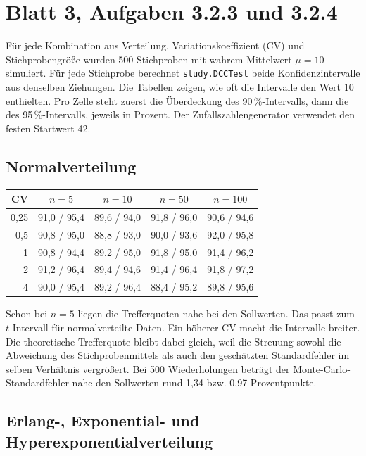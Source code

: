 \documentclass[a4paper,11pt]{article}
\begin{document}
\section*{Blatt 3, Aufgaben 3.2.3 und 3.2.4}

Für jede Kombination aus Verteilung, Variationskoeffizient (CV) und
Stichprobengröße wurden 500 Stichproben mit wahrem Mittelwert \(\mu=10\)
simuliert. Für jede Stichprobe berechnet \texttt{study.DCCTest} beide
Konfidenzintervalle aus denselben Ziehungen. Die Tabellen zeigen, wie oft
die Intervalle den Wert 10 enthielten. Pro Zelle steht zuerst die
Überdeckung des 90\,\%-Intervalls, dann die des 95\,\%-Intervalls, jeweils
in Prozent. Der Zufallszahlengenerator verwendet den festen Startwert 42.

\subsection*{Normalverteilung}

\begin{center}
\begin{tabular}{@{}rcccc@{}}
\toprule
CV & \(n=5\) & \(n=10\) & \(n=50\) & \(n=100\) \\
\midrule
0,25 & 91,0 / 95,4 & 89,6 / 94,0 & 91,8 / 96,0 & 90,6 / 94,6 \\
0,5  & 90,8 / 95,0 & 88,8 / 93,0 & 90,0 / 93,6 & 92,0 / 95,8 \\
1    & 90,8 / 94,4 & 89,2 / 95,0 & 91,8 / 95,0 & 91,4 / 96,2 \\
2    & 91,2 / 96,4 & 89,4 / 94,6 & 91,4 / 96,4 & 91,8 / 97,2 \\
4    & 90,0 / 95,4 & 89,2 / 96,4 & 88,4 / 95,2 & 89,8 / 95,6 \\
\bottomrule
\end{tabular}
\end{center}

Schon bei \(n=5\) liegen die Trefferquoten nahe bei den Sollwerten. Das
passt zum \(t\)-Intervall für normalverteilte Daten. Ein höherer CV macht
die Intervalle breiter. Die theoretische Trefferquote bleibt dabei gleich,
weil die Streuung sowohl die Abweichung des Stichprobenmittels als auch
den geschätzten Standardfehler im selben Verhältnis vergrößert. Bei 500
Wiederholungen beträgt der Monte-Carlo-Standardfehler nahe den Sollwerten
rund 1,34 bzw. 0,97 Prozentpunkte.

\subsection*{Erlang-, Exponential- und Hyperexponentialverteilung}
\end{document}
